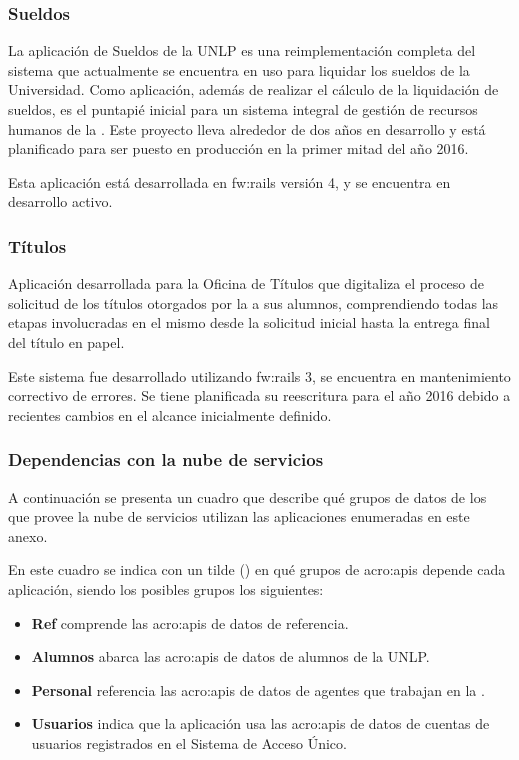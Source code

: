 \subsubsection{Sueldos}
\label{anexo:detalle-clientes:sueldos}

La aplicación de Sueldos de la UNLP es una reimplementación completa del sistema que actualmente se encuentra en uso para liquidar los sueldos de la Universidad. Como aplicación, además de realizar el cálculo de la liquidación de sueldos, es el puntapié inicial para un sistema integral de gestión de recursos humanos de la \unlp. Este proyecto lleva alrededor de dos años en desarrollo y está planificado para ser puesto en producción en la primer mitad del año 2016.

Esta aplicación está desarrollada en \gls{fw:rails} versión 4, y se encuentra en desarrollo activo.


\subsubsection{Títulos}
\label{anexo:detalle-clientes:titulos}

Aplicación desarrollada para la Oficina de Títulos que digitaliza el proceso de solicitud de los títulos otorgados por la \unlp a sus alumnos, comprendiendo todas las etapas involucradas en el mismo desde la solicitud inicial hasta la entrega final del título en papel.

Este sistema fue desarrollado utilizando \gls{fw:rails} 3, se encuentra en mantenimiento correctivo de errores. Se tiene planificada su reescritura para el año 2016 debido a recientes cambios en el alcance inicialmente definido.


\subsubsection{Dependencias con la nube de servicios}
\label{anexo:detalle-clientes:dependencias-nube}

A continuación se presenta un cuadro que describe qué grupos de datos de los que provee la nube de servicios utilizan las aplicaciones enumeradas en este anexo.

En este cuadro se indica con un tilde (\checkmark) en qué grupos de \glspl{acro:api} depende cada aplicación, siendo los posibles grupos los siguientes:

\begin{itemize}
  \item \textbf{Ref} comprende las \glspl{acro:api} de datos de referencia.
  \item \textbf{Alumnos} abarca las \glspl{acro:api} de datos de alumnos de la UNLP.
  \item \textbf{Personal} referencia las \glspl{acro:api} de datos de agentes que trabajan en la \unlp.
  \item \textbf{Usuarios} indica que la aplicación usa las \glspl{acro:api} de datos de cuentas de usuarios registrados en el Sistema de Acceso Único.
\end{itemize}

